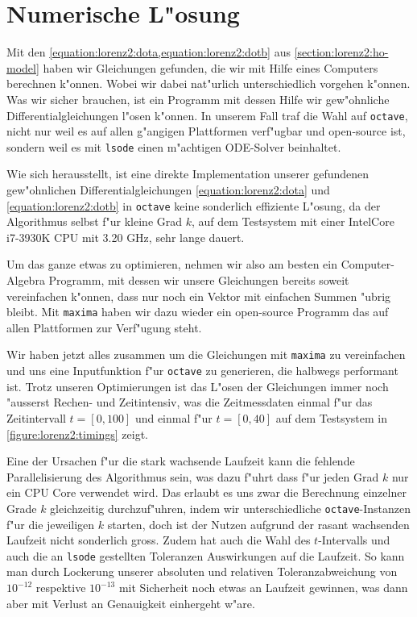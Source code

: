 \section{Numerische L"osung\label{section:lorenz2:numeric-solution}}
Mit den \cref{equation:lorenz2:dota,equation:lorenz2:dotb} aus 
\cref{section:lorenz2:ho-model} haben wir Gleichungen gefunden, die wir mit 
Hilfe eines Computers berechnen k"onnen. Wobei wir dabei nat"urlich 
unterschiedlich vorgehen k"onnen. Was wir sicher brauchen, ist ein Programm mit 
dessen Hilfe wir gew"ohnliche Differentialgleichungen l"osen k"onnen. In 
unserem Fall traf die Wahl auf \texttt{octave}, nicht nur weil es auf allen 
g"angigen Plattformen verf"ugbar und open-source ist, sondern weil es mit 
\texttt{lsode} einen m"achtigen  ODE-Solver beinhaltet.

Wie sich herausstellt, ist eine direkte Implementation unserer gefundenen 
gew"ohnlichen Differentialgleichungen \cref{equation:lorenz2:dota} und 
\cref{equation:lorenz2:dotb} in \texttt{octave} keine sonderlich effiziente 
L"osung, da der Algorithmus selbst f"ur kleine Grad $k$, auf dem Testsystem mit 
einer Intel\textregistered Core\texttrademark\, i7-3930K CPU mit 3.20 GHz, sehr 
lange dauert.

Um das ganze etwas zu optimieren, nehmen wir also am besten ein 
Computer-Algebra Programm, mit dessen wir unsere Gleichungen bereits soweit 
vereinfachen k"onnen, dass nur noch ein Vektor mit einfachen Summen "ubrig 
bleibt. Mit \texttt{maxima} haben wir dazu wieder ein open-source Programm das 
auf allen Plattformen zur Verf"ugung steht.

Wir haben jetzt alles zusammen um die Gleichungen mit \texttt{maxima} zu 
vereinfachen und uns eine Inputfunktion f"ur \texttt{octave} zu generieren, die 
halbwegs performant ist. Trotz unseren Optimierungen ist das L"osen der 
Gleichungen immer noch "ausserst Rechen- und Zeitintensiv, was die 
Zeitmessdaten einmal f"ur das Zeitintervall $t = [0,100]$ und einmal f"ur $t = 
[0,40]$ auf dem Testsystem in \cref{figure:lorenz2:timings} zeigt.

Eine der Ursachen f"ur die stark wachsende Laufzeit kann die fehlende 
Parallelisierung des Algorithmus sein, was dazu f"uhrt dass f"ur jeden Grad $k$ 
nur ein CPU Core verwendet wird. Das erlaubt es uns zwar die Berechnung 
einzelner Grade $k$ gleichzeitig durchzuf"uhren, indem wir unterschiedliche 
\texttt{octave}-Instanzen f"ur die jeweiligen $k$ starten, doch ist der Nutzen 
aufgrund der rasant wachsenden Laufzeit nicht sonderlich gross. Zudem hat auch 
die Wahl des $t$-Intervalls und auch die an \texttt{lsode} gestellten 
Toleranzen Auswirkungen auf die Laufzeit. So kann man durch Lockerung unserer 
absoluten und relativen Toleranzabweichung von $10^{-12}$ respektive $10^{-13}$ 
mit Sicherheit noch etwas an Laufzeit gewinnen, was dann aber mit Verlust an 
Genauigkeit einhergeht w"are.

